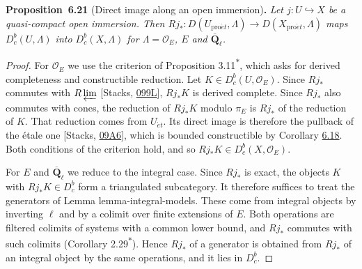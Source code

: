 \documentclass[11pt]{article}
\newenvironment{bpstatement}[2]{\par\addvspace{0.6\baselineskip}\noindent\textbf{#1}#2\textbf{.}\enspace\ignorespaces}
  {\par\addvspace{0.4\baselineskip}}
\newenvironment{bpstatementit}[2]{\begin{bpstatement}{#1}{#2}\itshape\ignorespaces}{\end{bpstatement}}
\newcommand{\bpout}[1]{#1\textsuperscript{\hyperlink{bp-outside}{\ensuremath{\ast}}}}
\providecommand{\Dbc}{}\renewcommand{\Dbc}{D^b_c}
\begin{document}
\label{bp65}%
\begin{bpstatementit}{Proposition~6.21}{ (Direct image along an open immersion)}
Let \(j:U\hookrightarrow X\) be a quasi-compact open immersion. Then \(Rj_*:D(U_{\mathrm{pro}\acute{e}t},\Lambda)\to D(X_{\mathrm{pro}\acute{e}t},\Lambda)\) maps \(\Dbc(U,\Lambda)\) into \(\Dbc(X,\Lambda)\) for \(\Lambda=\mathcal O_E\), \(E\) and \(\overline{\mathbf Q}_\ell\).
\end{bpstatementit}

\begin{proof}[{Proof}]\label{bp66}%
For \(\mathcal O_E\) we use the criterion of Proposition \bpout{3.11}, which asks for derived completeness and constructible reduction. Let \(K\in\Dbc(U,\mathcal O_E)\). Since \(Rj_*\) commutes with \(R\varprojlim\) [Stacks, \href{https://stacks.math.columbia.edu/tag/099L}{099L}], \(Rj_*K\) is derived complete. Since \(Rj_*\) also commutes with cones, the reduction of \(Rj_*K\) modulo \(\pi_E\) is \(Rj_*\) of the reduction of \(K\). That reduction comes from \(U_{\acute{e}t}\). Its direct image is therefore the pullback of the étale one [Stacks, \href{https://stacks.math.columbia.edu/tag/09A6}{09A6}], which is bounded constructible by Corollary \hyperref[bp54]{6.18}. Both conditions of the criterion hold, and so \(Rj_*K\in\Dbc(X,\mathcal O_E)\).

For \(E\) and \(\overline{\mathbf Q}_\ell\) we reduce to the integral case. Since \(Rj_*\) is exact, the objects \(K\) with \(Rj_*K\in\Dbc\) form a triangulated subcategory. It therefore suffices to treat the generators of Lemma lemma-integral-models. These come from integral objects by inverting \(\ell\) and by a colimit over finite extensions of \(E\). Both operations are filtered colimits of systems with a common lower bound, and \(Rj_*\) commutes with such colimits (Corollary \bpout{2.29}). Hence \(Rj_*\) of a generator is obtained from \(Rj_*\) of an integral object by the same operations, and it lies in \(\Dbc\).
\end{proof}

\end{document}

